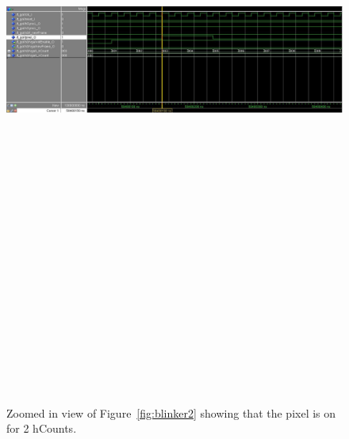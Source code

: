 \documentclass[twoside, letterpaper]{report}
\begin{document}
\begin{figure}
\centering
\includegraphics[angle=90, height=9in]{./media/blinker_3.jpg}
\caption{\label{fig:blinker3}Zoomed in view of Figure~\ref{fig:blinker2} showing that the pixel is on for 2 hCounts.}
\end{figure}
\end{document}
